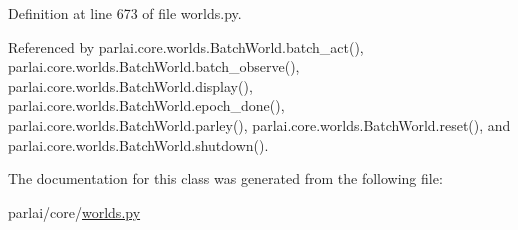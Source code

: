 Definition at line 673 of file worlds.\+py.



Referenced by parlai.\+core.\+worlds.\+Batch\+World.\+batch\+\_\+act(), parlai.\+core.\+worlds.\+Batch\+World.\+batch\+\_\+observe(), parlai.\+core.\+worlds.\+Batch\+World.\+display(), parlai.\+core.\+worlds.\+Batch\+World.\+epoch\+\_\+done(), parlai.\+core.\+worlds.\+Batch\+World.\+parley(), parlai.\+core.\+worlds.\+Batch\+World.\+reset(), and parlai.\+core.\+worlds.\+Batch\+World.\+shutdown().



The documentation for this class was generated from the following file\+:\begin{DoxyCompactItemize}
\item 
parlai/core/\hyperlink{parlai_2core_2worlds_8py}{worlds.\+py}\end{DoxyCompactItemize}

